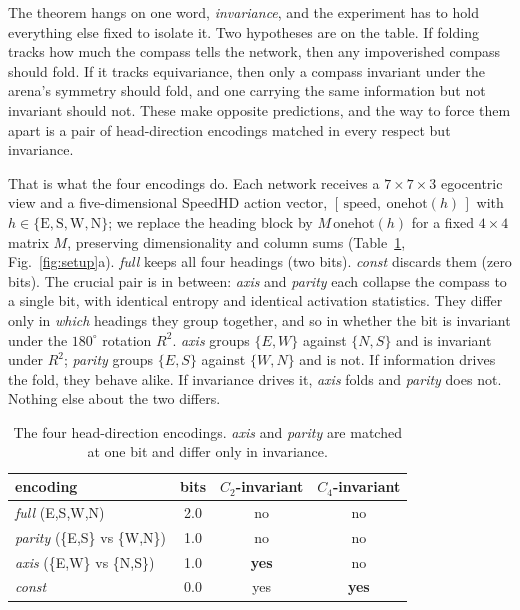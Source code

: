 The theorem hangs on one word, \emph{invariance}, and the experiment has to hold everything else
fixed to isolate it. Two hypotheses are on the table. If folding tracks how much the compass tells the
network, then any impoverished compass should fold. If it tracks equivariance, then only a compass
invariant under the arena's symmetry should fold, and one carrying the same information but not
invariant should not. These make opposite predictions, and the way to force them apart is a pair of
head-direction encodings matched in every respect but invariance.

That is what the four encodings do. Each network receives a $7\times7\times3$ egocentric view and a
five-dimensional SpeedHD action vector, $[\,\text{speed},\ \mathrm{onehot}(h)\,]$ with $h \in
\{\text{E},\text{S},\text{W},\text{N}\}$; we replace the heading block by $M\,\mathrm{onehot}(h)$ for
a fixed $4\times4$ matrix $M$, preserving dimensionality and column sums (Table~\ref{tab:encodings},
Fig.~\ref{fig:setup}a). \textit{full} keeps all four headings (two bits). \textit{const} discards
them (zero bits). The crucial pair is in between: \textit{axis} and \textit{parity} each collapse the
compass to a single bit, with identical entropy and identical activation statistics. They differ only
in \emph{which} headings they group together, and so in whether the bit is invariant under the
$180^\circ$ rotation $R^2$. \textit{axis} groups $\{E,W\}$ against $\{N,S\}$ and is invariant under
$R^2$; \textit{parity} groups $\{E,S\}$ against $\{W,N\}$ and is not. If information drives the fold,
they behave alike. If invariance drives it, \textit{axis} folds and \textit{parity} does not. Nothing
else about the two differs.

\begin{table}[t]
\centering
\caption{The four head-direction encodings. \textit{axis} and \textit{parity} are matched at
one bit and differ only in invariance.}
\label{tab:encodings}
\begin{tabular}{lccc}
\toprule
encoding & bits & $C_2$-invariant & $C_4$-invariant \\
\midrule
\textit{full} (E,S,W,N)            & 2.0 & no  & no  \\
\textit{parity} (\{E,S\} vs \{W,N\}) & 1.0 & no  & no  \\
\textit{axis} (\{E,W\} vs \{N,S\})   & 1.0 & \textbf{yes} & no \\
\textit{const}                     & 0.0 & yes & \textbf{yes} \\
\bottomrule
\end{tabular}
\end{table}

